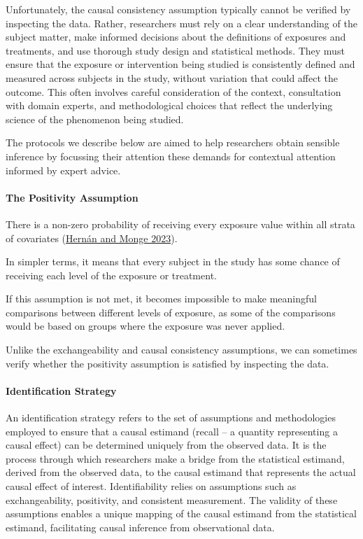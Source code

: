 \documentclass[
  singlecolumn]{article}
\let\oldparagraph\paragraph
\renewcommand{\paragraph}[1]{\oldparagraph{#1}\mbox{}}
\begin{document}
Unfortunately, the causal consistency assumption typically cannot be
verified by inspecting the data. Rather, researchers must rely on a
clear understanding of the subject matter, make informed decisions about
the definitions of exposures and treatments, and use thorough study
design and statistical methods. They must ensure that the exposure or
intervention being studied is consistently defined and measured across
subjects in the study, without variation that could affect the outcome.
This often involves careful consideration of the context, consultation
with domain experts, and methodological choices that reflect the
underlying science of the phenomenon being studied.

The protocols we describe below are aimed to help researchers obtain
sensible inference by focussing their attention these demands for
contextual attention informed by expert advice.

\paragraph{\texorpdfstring{\textbf{The Positivity
Assumption}}{The Positivity Assumption}}\label{the-positivity-assumption}

There is a non-zero probability of receiving every exposure value within
all strata of covariates (\hyperref[ref-hernuxe1n2023]{Hernán and Monge
2023}).

In simpler terms, it means that every subject in the study has some
chance of receiving each level of the exposure or treatment.

If this assumption is not met, it becomes impossible to make meaningful
comparisons between different levels of exposure, as some of the
comparisons would be based on groups where the exposure was never
applied.

Unlike the exchangeability and causal consistency assumptions, we can
sometimes verify whether the positivity assumption is satisfied by
inspecting the data.

\paragraph{\texorpdfstring{\textbf{Identification
Strategy}}{Identification Strategy}}\label{identification-strategy}

An identification strategy refers to the set of assumptions and
methodologies employed to ensure that a causal estimand (recall -- a
quantity representing a causal effect) can be determined uniquely from
the observed data. It is the process through which researchers make a
bridge from the statistical estimand, derived from the observed data, to
the causal estimand that represents the actual causal effect of
interest. Identifiability relies on assumptions such as exchangeability,
positivity, and consistent measurement. The validity of these
assumptions enables a unique mapping of the causal estimand from the
statistical estimand, facilitating causal inference from observational
data.
\end{document}
